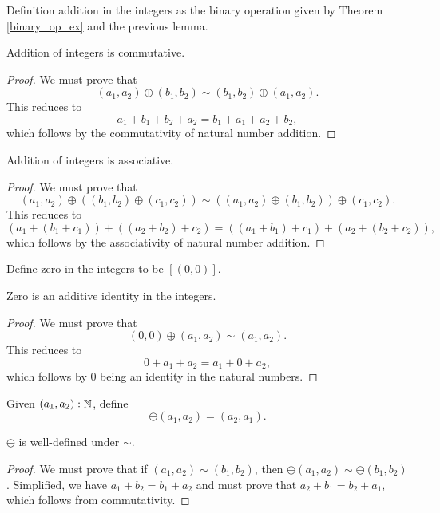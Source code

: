 \documentclass[../../math.tex]{subfiles}
\begin{document}
\begin{instance}
    Definition addition in the integers as the binary operation given by Theorem
    \ref{binary_op_ex} and the previous lemma.
\end{instance}

\begin{instance}
    Addition of integers is commutative.
\end{instance}
\begin{proof}
    We must prove that
    \[
        (a_1, a_2) \oplus (b_1, b_2) \sim (b_1, b_2) \oplus (a_1, a_2).
    \]
    This reduces to
    \[
        a_1 + b_1 + b_2 + a_2 = b_1 + a_1 + a_2 + b_2,
    \]
    which follows by the commutativity of natural number addition.
\end{proof}

\begin{instance}
    Addition of integers is associative.
\end{instance}
\begin{proof}
    We must prove that
    \[
        (a_1, a_2) \oplus ((b_1, b_2) \oplus (c_1, c_2)) \sim
        ((a_1, a_2) \oplus (b_1, b_2)) \oplus (c_1, c_2).
    \]
    This reduces to
    \[
        (a_1 + (b_1 + c_1)) + ((a_2 + b_2) + c_2) =
        ((a_1 + b_1) + c_1) + (a_2 + (b_2 + c_2)),
    \]
    which follows by the associativity of natural number addition.
\end{proof}

\begin{instance}
    Define zero in the integers to be $[(0, 0)]$.
\end{instance}

\begin{instance}
    Zero is an additive identity in the integers.
\end{instance}
\begin{proof}
    We must prove that
    \[
        (0, 0) \oplus (a_1, a_2) \sim (a_1, a_2).
    \]
    This reduces to
    \[
        0 + a_1 + a_2 = a_1 + 0 + a_2,
    \]
    which follows by 0 being an identity in the natural numbers.
\end{proof}

\begin{definition}
    Given $(a_1, a_2) : \mathbb{N}$, define
    \[
        \ominus (a_1, a_2) = (a_2, a_1).
    \]
\end{definition}

\begin{lemma}
    $\ominus$ is well-defined under $\sim$.
\end{lemma}
\begin{proof}
    We must prove that if $(a_1, a_2) \sim (b_1, b_2)$, then $\ominus (a_1, a_2)
    \sim \ominus (b_1, b_2)$.  Simplified, we have $a_1 + b_2 = b_1 + a_2$ and
    must prove that $a_2 + b_1 = b_2 + a_1$, which follows from commutativity.
\end{proof}
\end{document}

